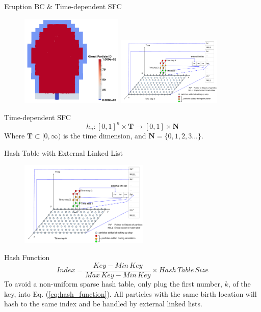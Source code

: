 \documentclass{beamer}
\begin{document}
\begin{frame}{Eruption BC $\&$ Time-dependent SFC}
\begin{figure}
\flushleft
\includegraphics[width=0.435\textwidth]{../Boundary-condition-eps-converted-to}
\hfill
\includegraphics[width=0.445\textwidth]{../Particle_adding_with_link}
\end{figure}
\begin{block}{Time-dependent SFC}
\begin{equation}
h_n: [0,1]^n \times \textbf{T} \rightarrow [0,1] \times \textbf{N}
\end{equation}
Where $\textbf{T} \subset [0,\infty)$ is the time dimension, and $\textbf{N}=\lbrace 0, 1, 2, 3...\rbrace$.
\end{block}
\end{frame}

\begin{frame}{Hash Table with External Linked List}
\begin{figure}
\includegraphics[width=0.55\textwidth]{../Particle_adding_with_link}
\end{figure}
\begin{block}{Hash Function}
\begin{equation}
Index= \frac{Key - Min\,Key}{Max\,Key - Min\,Key} 
\times Hash\,Table\,Size 
\label{eq:hash_function}
\end{equation}
To avoid a non-uniform sparse hash table, only plug the first number, $k$, of the key, into Eq. (\ref{eq:hash_function}). All particles with the same birth location will hash to the same index and be handled by external linked lists.
\end{block}
\end{frame}
\end{document}
